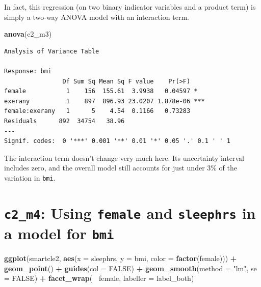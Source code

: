 \documentclass[]{book}
\newenvironment{Shaded}{\begin{snugshade}}{\end{snugshade}}
\newcommand{\KeywordTok}[1]{\textcolor[rgb]{0.13,0.29,0.53}{\textbf{#1}}}
\newcommand{\DataTypeTok}[1]{\textcolor[rgb]{0.13,0.29,0.53}{#1}}
\newcommand{\StringTok}[1]{\textcolor[rgb]{0.31,0.60,0.02}{#1}}
\newcommand{\OtherTok}[1]{\textcolor[rgb]{0.56,0.35,0.01}{#1}}
\newcommand{\OperatorTok}[1]{\textcolor[rgb]{0.81,0.36,0.00}{\textbf{#1}}}
\newcommand{\NormalTok}[1]{#1}
\theoremstyle{definition}
\theoremstyle{definition}
\theoremstyle{definition}
\theoremstyle{remark}
\begin{document}
In fact, this regression (on two binary indicator variables and a
product term) is simply a two-way ANOVA model with an interaction term.

\begin{Shaded}
\begin{Highlighting}[]
\KeywordTok{anova}\NormalTok{(c2_m3)}
\end{Highlighting}
\end{Shaded}

\begin{verbatim}
Analysis of Variance Table

Response: bmi
                Df Sum Sq Mean Sq F value    Pr(>F)    
female           1    156  155.61  3.9938   0.04597 *  
exerany          1    897  896.93 23.0207 1.878e-06 ***
female:exerany   1      5    4.54  0.1166   0.73283    
Residuals      892  34754   38.96                      
---
Signif. codes:  0 '***' 0.001 '**' 0.01 '*' 0.05 '.' 0.1 ' ' 1
\end{verbatim}

The interaction term doesn't change very much here. Its uncertainty
interval includes zero, and the overall model still accounts for just
under 3\% of the variation in \texttt{bmi}.

\section{\texorpdfstring{\texttt{c2\_m4}: Using \texttt{female} and
\texttt{sleephrs} in a model for
\texttt{bmi}}{c2\_m4: Using female and sleephrs in a model for bmi}}\label{c2_m4-using-female-and-sleephrs-in-a-model-for-bmi}

\begin{Shaded}
\begin{Highlighting}[]
\KeywordTok{ggplot}\NormalTok{(smartcle2, }\KeywordTok{aes}\NormalTok{(}\DataTypeTok{x =}\NormalTok{ sleephrs, }\DataTypeTok{y =}\NormalTok{ bmi, }\DataTypeTok{color =} \KeywordTok{factor}\NormalTok{(female))) }\OperatorTok{+}
\StringTok{    }\KeywordTok{geom_point}\NormalTok{() }\OperatorTok{+}\StringTok{ }
\StringTok{    }\KeywordTok{guides}\NormalTok{(}\DataTypeTok{col =} \OtherTok{FALSE}\NormalTok{) }\OperatorTok{+}
\StringTok{    }\KeywordTok{geom_smooth}\NormalTok{(}\DataTypeTok{method =} \StringTok{"lm"}\NormalTok{, }\DataTypeTok{se =} \OtherTok{FALSE}\NormalTok{) }\OperatorTok{+}
\StringTok{    }\KeywordTok{facet_wrap}\NormalTok{(}\OperatorTok{~}\StringTok{ }\NormalTok{female, }\DataTypeTok{labeller =}\NormalTok{ label_both) }
\end{Highlighting}
\end{Shaded}
\end{document}
